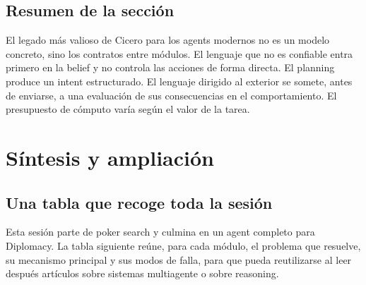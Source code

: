 \documentclass[a4paper]{article}
\begin{document}
\subsection{Resumen de la sección}

El legado más valioso de Cicero para los agents modernos no es un modelo concreto, sino los contratos entre módulos. El lenguaje que no es confiable entra primero en la belief y no controla las acciones de forma directa. El planning produce un intent estructurado. El lenguaje dirigido al exterior se somete, antes de enviarse, a una evaluación de sus consecuencias en el comportamiento. El presupuesto de cómputo varía según el valor de la tarea.
\section{Síntesis y ampliación}

\subsection{Una tabla que recoge toda la sesión}

Esta sesión parte de poker search y culmina en un agent completo para Diplomacy. La tabla siguiente reúne, para cada módulo, el problema que resuelve, su mecanismo principal y sus modos de falla, para que pueda reutilizarse al leer después artículos sobre sistemas multiagente o sobre reasoning.
\end{document}
